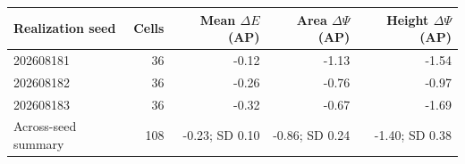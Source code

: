 \begin{tabular}{lrrrr}
\toprule
Realization seed & Cells & Mean $\Delta E$ (AP) & Area $\Delta\Psi$ (AP) & Height $\Delta\Psi$ (AP) \\
\midrule
202608181 & 36 & -0.12 & -1.13 & -1.54 \\
202608182 & 36 & -0.26 & -0.76 & -0.97 \\
202608183 & 36 & -0.32 & -0.67 & -1.69 \\
Across-seed summary & 108 & -0.23; SD 0.10 & -0.86; SD 0.24 & -1.40; SD 0.38 \\
\bottomrule
\end{tabular}
